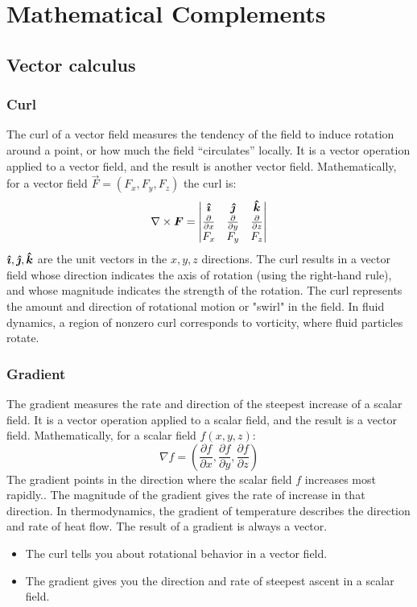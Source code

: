 \appendix
\chapter{Mathematical Complements}\label{ch:appendixA}

\section{Vector calculus}\label{sec:vector-calc}
\subsection{Curl}\label{subsec:curl}
The curl of a vector field measures the tendency of the field to induce rotation around a point, or how much the field ``circulates'' locally.
It is a vector operation applied to a vector field, and the result is another vector field. Mathematically, for a vector field $\vec{F}=(F_x, F_y, F_z)$ the curl is:
\[
	\nabla\times \vec{F}=
	\begin{vmatrix}
		\unitv{\imath}              & \unitv{\jmath}              & \unitv{k}                   \\
		\frac{\partial}{\partial x} & \frac{\partial}{\partial y} & \frac{\partial}{\partial z} \\
		F_x                         & F_y                         & F_z
	\end{vmatrix}
\]
$\bm{\hat{\imath}}, \bm{\hat{\jmath}}, \bm{\hat{k}}$ are the unit vectors in the $x,y,z$ directions.
The curl results in a vector field whose direction indicates the axis of rotation (using the right-hand rule), and whose magnitude indicates the strength of the rotation.  The curl represents the amount and direction of rotational motion or "swirl" in the field. In fluid dynamics, a region of nonzero curl corresponds to vorticity, where fluid particles rotate.

\subsection{Gradient}\label{subsec:gradient}
The gradient measures the rate and direction of the steepest increase of a scalar field. It is a vector operation applied to a scalar field, and the result is a vector field. Mathematically, for a scalar field $f(x,y,z)$:
\[\nabla f=\left(\frac{\partial f}{\partial x}, \frac{\partial f}{\partial y}, \frac{\partial f}{\partial z}\right)\]
The gradient points in the direction where the scalar field $f$ increases most rapidly.. The magnitude of the gradient gives the rate of increase in that direction. In thermodynamics, the gradient of temperature describes the direction and rate of heat flow. The result of a gradient is always a vector.
\begin{itemize}
	\item The curl tells you about rotational behavior in a vector field.
	\item The gradient gives you the direction and rate of steepest ascent in a scalar field.
\end{itemize}

